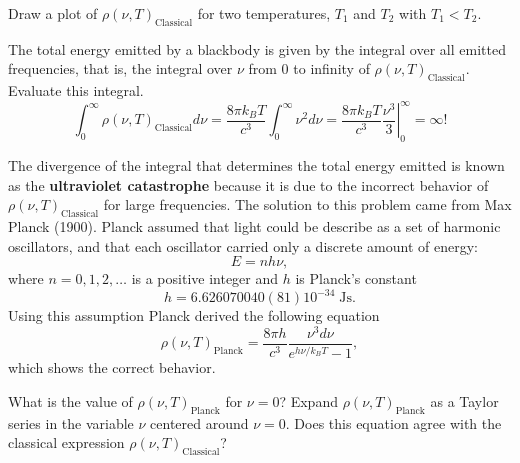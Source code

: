 \begin{exercise}
Draw a plot of $\rho(\nu,T)_\mathrm{Classical}$ for two temperatures, $T_1$ and $T_2$ with $T_1 < T_2$.
\end{exercise}
\begin{exercise}
The total energy emitted by a blackbody is given by the integral over all emitted frequencies, that is, the integral over $\nu$ from 0 to infinity of $\rho(\nu,T)_\mathrm{Classical}$.
Evaluate this integral.
\begin{equation}
\int_0^\infty \rho(\nu,T)_\mathrm{Classical} d\nu 
= \frac{8 \pi k_B T}{c^3} \int_0^\infty  \nu^2 d\nu
= \frac{8 \pi k_B T}{c^3} \left.  \frac{\nu^3}{3}  \right|_0^\infty = \infty !
\end{equation}
\end{exercise}

The divergence of the integral that determines the total energy emitted is known as the \textbf{ultraviolet catastrophe} because it is due to the incorrect behavior of $\rho(\nu,T)_\mathrm{Classical}$ for large frequencies.
The solution to this problem came from Max Planck (1900).
Planck assumed that light could be describe as a set of harmonic oscillators, and that each oscillator carried only a discrete amount of energy:
\begin{equation}
E = n h \nu,
\end{equation}
where $n = 0, 1, 2, \ldots$ is a positive integer and $h$ is Planck's constant
\begin{equation}
h = 6.626070040(81) 10^{-34}\;\si{\joule\second}.
\end{equation}
Using this assumption Planck derived the following equation
\begin{equation}
\rho(\nu,T)_\mathrm{Planck} =  \frac{8 \pi h}{c^3} \frac{\nu^3 d\nu}{e^{h\nu/k_B T} -1},
\end{equation}
which shows the correct behavior.

\begin{exercise}
What is the value of $\rho(\nu,T)_\mathrm{Planck}$ for $\nu = 0$?
Expand $\rho(\nu,T)_\mathrm{Planck}$ as a Taylor series in the variable $\nu$ centered around $\nu = 0$.
Does this equation agree with the classical expression $\rho(\nu,T)_\mathrm{Classical}$?
\end{exercise}

